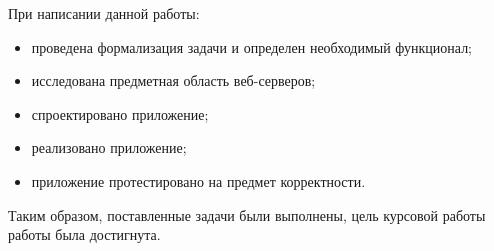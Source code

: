 \documentclass{bmstu}
\begin{document}
При написании данной работы:

\begin{itemize}
	\item проведена формализация задачи и определен необходимый функционал;
	\item исследована предметная область веб-серверов;
	\item спроектировано приложение;
	\item реализовано приложение;
	\item приложение протестировано на предмет корректности.
\end{itemize}

Таким образом, поставленные задачи были выполнены, цель курсовой работы работы была достигнута.

    

\clearpage
\makebibliography



% 
% 

% 
% 
% 
% 
% 
% 

% 
\end{document}
